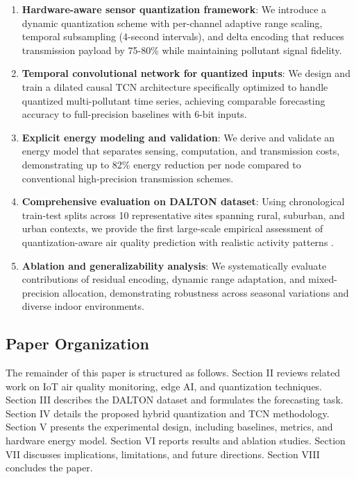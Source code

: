\begin{enumerate}
\item \textbf{Hardware-aware sensor quantization framework}: We introduce a dynamic quantization scheme with per-channel adaptive range scaling, temporal subsampling (4-second intervals), and delta encoding that reduces transmission payload by 75-80\% while maintaining pollutant signal fidelity.

\item \textbf{Temporal convolutional network for quantized inputs}: We design and train a dilated causal TCN architecture specifically optimized to handle quantized multi-pollutant time series, achieving comparable forecasting accuracy to full-precision baselines with 6-bit inputs.

\item \textbf{Explicit energy modeling and validation}: We derive and validate an energy model that separates sensing, computation, and transmission costs, demonstrating up to 82\% energy reduction per node compared to conventional high-precision transmission schemes.

\item \textbf{Comprehensive evaluation on DALTON dataset}: Using chronological train-test splits across 10 representative sites spanning rural, suburban, and urban contexts, we provide the first large-scale empirical assessment of quantization-aware air quality prediction with realistic activity patterns \cite{karmakar2024indoor}.

\item \textbf{Ablation and generalizability analysis}: We systematically evaluate contributions of residual encoding, dynamic range adaptation, and mixed-precision allocation, demonstrating robustness across seasonal variations and diverse indoor environments.
\end{enumerate}

\subsection{Paper Organization}

The remainder of this paper is structured as follows. Section II reviews related work on IoT air quality monitoring, edge AI, and quantization techniques. Section III describes the DALTON dataset and formulates the forecasting task. Section IV details the proposed hybrid quantization and TCN methodology. Section V presents the experimental design, including baselines, metrics, and hardware energy model. Section VI reports results and ablation studies. Section VII discusses implications, limitations, and future directions. Section VIII concludes the paper.
